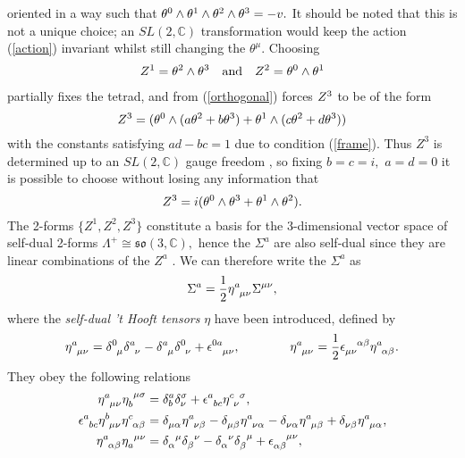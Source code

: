 \documentclass[a4paper,12pt, onecolumn, notitlepage]{article}
\theoremstyle{definition}
\theoremstyle{remark}
\newcommand{\al}{\alpha}
\newcommand{\m}{\mu}
\newcommand{\n}{\nu}
\newcommand{\e}{\epsilon}
\newcommand{\hooft}[3]{\eta\indices{^{#1}_{#2}_{#3}}}
\newcommand{\ihooft}[3]{\eta\indices{_{#1}^{#2}^{#3}}}
\begin{document}
oriented in a way such that $\theta\indices{^0}\wedge\theta\indices{^1}\wedge\theta\indices{^2}\wedge\theta\indices{^3}=-v.$ It should be noted that this is not a unique choice; an $SL(2,\mathbb{C})$ transformation would keep the action (\ref{action}) invariant whilst still changing the $\theta^{\m}.$ Choosing
\begin{align*}
	Z\indices{^1}=\theta\indices{^2}\wedge\theta\indices{^3}\quad\text{and}\quad
	Z\indices{^2}=\theta\indices{^0}\wedge\theta\indices{^1}
\end{align*}
partially fixes the tetrad, and from (\ref{orthogonal}) forces $Z\indices{^3}$ to be of the form 
\begin{equation*}
\label{z1z2}
	Z\indices{^3}=(\theta\indices{^0}\wedge(a\theta\indices{^2} + b\theta\indices{^3}) + \theta\indices{^1}\wedge(c\theta{^2} + d\theta\indices{^3}))
\end{equation*}
with the constants satisfying $ad-bc=1$ due to condition (\ref{frame}). Thus $Z^{3}$ is determined up to an $SL(2,\mathbb{C})$ gauge freedom \cite{plebanski_1975}, so fixing $b=c=i,$ $a=d=0$ it is possible to choose without losing any information that
\begin{equation*}
\label{z3}
	Z\indices{^3}=i(\theta\indices{^0}\wedge\theta\indices{^3} + \theta\indices{^1}\wedge\theta\indices{^2}).
\end{equation*}
The 2-forms $\{Z^{1},Z^{2}, Z^{3}\}$ constitute a basis for the 3-dimensional vector space of self-dual 2-forms $\Lambda^{+}\cong \mathfrak{so}(3,\mathbb{C}),$ hence the $\Sigma^{a}$ are also self-dual since they are linear combinations of the $Z^{a}$ \cite{cahen_1967}. We can therefore write the $\Sigma^{a}$ as 
\begin{equation*}
\Sigma^{a} =  \frac{1}{2}\hooft{a}{\mu}{\n}\Sigma\indices{^\m^\n},
\end{equation*}
where the \emph{self-dual 't Hooft tensors} $\eta$ have been introduced, defined by
\begin{equation}
	\label{hooft1}
	\hooft{a}{\m}{\n} =  \delta\indices{^0_\mu}\delta\indices{^a_\nu} - \delta\indices{^a_\mu}\delta\indices{^0_\nu} + \epsilon\indices{^0^a_\mu_\nu},\qquad\qquad\hooft{a}{\m}{\n}=\frac{1}{2}\e\indices{_\m_\n^\al^\beta}\hooft{a}{\al}{\beta}.\\
\end{equation}
They obey the following relations
\begin{subequations}
	\begin{align}
	\label{hooft2}
	\hooft{a}{\m}{\n}\ihooft{b}{\m}{\sigma} &= \delta^{a}_{b}\delta_{\nu}^{\sigma} + \epsilon\indices{^a_b_c}\eta\indices{^c_\n^\sigma},\\
	\label{hooft3}
	\e\indices{^a_b_c}\hooft{b}{\m}{\n}\hooft{c}{\al}{\beta}&=\delta\indices{_\m_\al}\hooft{a}{\n}{\beta}-\delta\indices{_\m_\beta}\hooft{a}{\n}{\al}-\delta\indices{_\n_\al}\hooft{a}{\m}{\beta}+\delta\indices{_\n_\beta}\hooft{a}{\m}{\al},\\
	\label{projection}
	\hooft{a}{\al}{\beta}\eta\indices{_{a}^{\mu}^{\nu}} &= \delta\indices{_\al^\mu}\delta\indices{_\beta^\nu} - \delta\indices{_\al^\nu}\delta\indices{_\beta^\mu} + \e\indices{_\al_\beta^\mu^\nu},
	\end{align}
\end{subequations}
\end{document}
